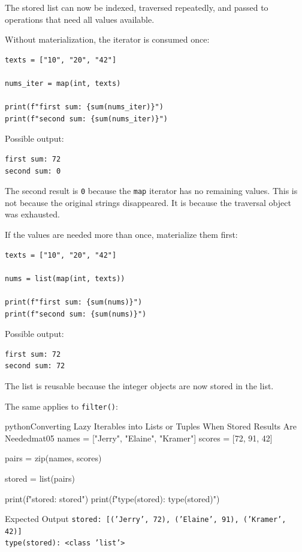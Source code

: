 \documentclass[a4paper,twoside]{report}
\begin{document}
The stored list can now be indexed, traversed repeatedly, and passed to operations that need all values available.

Without materialization, the iterator is consumed once:

\begin{verbatim}
texts = ["10", "20", "42"]

nums_iter = map(int, texts)

print(f"first sum: {sum(nums_iter)}")
print(f"second sum: {sum(nums_iter)}")
\end{verbatim}

Possible output:

\begin{verbatim}
first sum: 72
second sum: 0
\end{verbatim}

The second result is \texttt{0} because the \texttt{map} iterator has no remaining values. This is not because the original strings disappeared. It is because the traversal object was exhausted.

If the values are needed more than once, materialize them first:

\begin{verbatim}
texts = ["10", "20", "42"]

nums = list(map(int, texts))

print(f"first sum: {sum(nums)}")
print(f"second sum: {sum(nums)}")
\end{verbatim}

Possible output:

\begin{verbatim}
first sum: 72
second sum: 72
\end{verbatim}

The list is reusable because the integer objects are now stored in the list.

The same applies to \texttt{filter()}:

\begin{codebox}[]{python}{Converting Lazy Iterables into Lists or Tuples When Stored Results Are Needed}{mat05}
names = ["Jerry", "Elaine", "Kramer"]
scores = [72, 91, 42]

pairs = zip(names, scores)

stored = list(pairs)

print(f"stored: {stored}")
print(f"type(stored): {type(stored)}")
\end{codebox}


\begin{iobox}{Expected Output}
\texttt{stored: [('Jerry', 72), ('Elaine', 91), ('Kramer', 42)]} \\
\texttt{type(stored): <class 'list'>} \\
\end{iobox}
\end{document}
